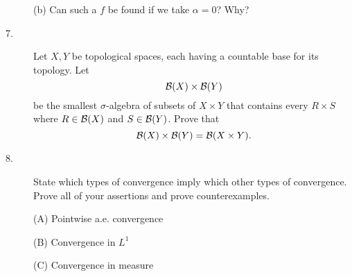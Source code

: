 \documentclass{article}
\begin{document}
\begin{description}
\item[\quad] (b)
Can such a $f$ be found if we take $\alpha =0$? Why?

\item[7.]
Let $X,Y$ be topological spaces, each having a countable base for its
topology. Let
$${\cal B} (X) \times {\cal B}(Y)$$
be the smallest $\sigma$-algebra of subsets of $X \times Y$ that contains
every $R \times S$ where $R \in {\cal B} (X)$ and $S \in {\cal B}(Y)$.
Prove that
$${\cal B}(X) \times {\cal B}(Y) = {\cal B}(X \times Y).$$

\item[8.]
State which types of convergence imply which other types of convergence. Prove
all of your assertions and prove counterexamples.

\item[\quad] (A)
Pointwise a.e. convergence

\item[\quad] (B)
Convergence in $L^1$

\item[\quad] (C)
Convergence in measure






\end{description}    
\end{document}
